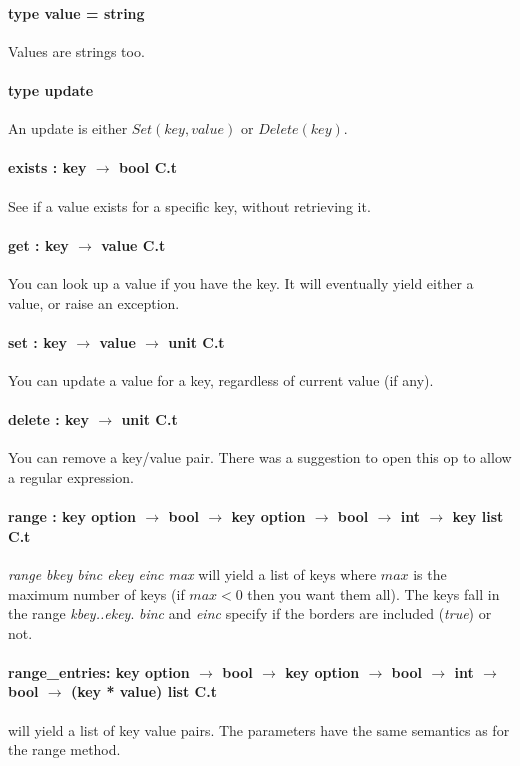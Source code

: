 \paragraph{type value = string}
Values are strings too.
\paragraph{type update}
An update is either $Set(key,value)$ or $Delete(key)$.
\paragraph{exists : key $\rightarrow$ bool C.t} See if a value exists for a specific key, without retrieving it.
\paragraph{get : key $\rightarrow$ value C.t}
You can look up a value if you have the key. It will eventually yield either a value, or raise an exception.
\paragraph{set : key $\rightarrow$ value $\rightarrow$ unit C.t}
You can update a value for a key, regardless of current value (if any).
\paragraph{delete : key $\rightarrow$ unit C.t}
You can remove a key/value pair. There was a suggestion to open this op to allow a regular expression.
\paragraph{range : key option $\rightarrow$ bool $\rightarrow$
  key option $\rightarrow$ bool $\rightarrow$
  int $\rightarrow$ key list C.t}
\emph{range bkey binc ekey einc max} will yield a list of keys where
$max$ is the maximum number of keys (if $max < 0$ then you want them all).
The keys fall in the range \emph{kbey..ekey}.
\emph{binc} and \emph{einc} specify if the borders are included (\emph{true}) or not.
\paragraph{range\_entries: key option $\rightarrow$ bool $\rightarrow$
  key option $\rightarrow$ bool $\rightarrow$
  int $\rightarrow$ bool $\rightarrow$ (key * value) list C.t
}
will yield a list of key value pairs.
The parameters have the same semantics as for the range method.

